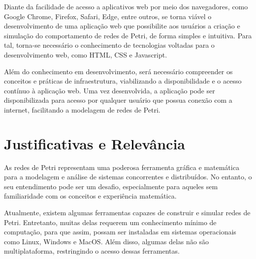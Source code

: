 \documentclass[
	12pt,				%
	openright,			%
	oneside,			%
	a4paper,			%
	english,			%
	brazil				%
	]{abntex2}
\theoremstyle{doispontos}
\begin{document}
Diante da facilidade de acesso a aplicativos web por meio dos navegadores, como Google Chrome, Firefox, Safari, Edge, entre outros, se torna viável o desenvolvimento de uma aplicação web que possibilite aos usuários a criação e simulação do comportamento de redes de Petri, de forma simples e intuitiva. Para tal, torna-se necessário o conhecimento de tecnologias voltadas para o desenvolvimento web, como HTML, CSS e Javascript.

Além do conhecimento em desenvolvimento, será necessário  compreender os conceitos e práticas de infraestrutura, viabilizando a disponibilidade e o acesso contínuo à aplicação web. Uma vez desenvolvida, a aplicação pode ser disponibilizada para acesso por qualquer usuário que possua conexão com a internet, facilitando a modelagem de redes de Petri.




\section{Justificativas e Relevância}

As redes de Petri representam uma poderosa ferramenta gráfica e matemática para a modelagem e análise de sistemas concorrentes e distribuídos. No entanto, o seu entendimento pode ser um desafio, especialmente para aqueles sem familiaridade com os conceitos e experiência matemática.

Atualmente, existem algumas ferramentas capazes de construir e simular redes de Petri. Entretanto, muitas delas requerem um conhecimento mínimo de computação, para que assim, possam ser instaladas em sistemas operacionais como Linux, Windows e MacOS. Além disso, algumas delas não são multiplataforma, restringindo o acesso dessas ferramentas.
\end{document}
